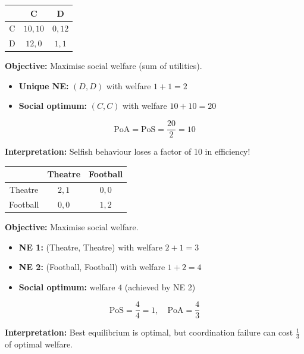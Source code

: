 \begin{exbox}
\begin{center}
\renewcommand{\arraystretch}{1.2}
\begin{tabular}{@{} c | c c @{}}
 & C & D \\
\midrule
C & $10, 10$ & $0, 12$ \\
D & $12, 0$ & $1, 1$ \\
\end{tabular}
\end{center}

\textbf{Objective:} Maximise social welfare (sum of utilities).

\begin{itemize}
  \item \textbf{Unique NE:} $(D, D)$ with welfare $1 + 1 = 2$
  \item \textbf{Social optimum:} $(C, C)$ with welfare $10 + 10 = 20$
\end{itemize}

\[
\text{PoA} = \text{PoS} = \frac{20}{2} = 10
\]

\textbf{Interpretation:} Selfish behaviour loses a factor of 10 in efficiency!
\end{exbox}

\begin{exbox}
\begin{center}
\renewcommand{\arraystretch}{1.2}
\begin{tabular}{@{} c | c c @{}}
 & Theatre & Football \\
\midrule
Theatre & $2, 1$ & $0, 0$ \\
Football & $0, 0$ & $1, 2$ \\
\end{tabular}
\end{center}

\textbf{Objective:} Maximise social welfare.

\begin{itemize}
  \item \textbf{NE 1:} (Theatre, Theatre) with welfare $2 + 1 = 3$
  \item \textbf{NE 2:} (Football, Football) with welfare $1 + 2 = 4$
  \item \textbf{Social optimum:} welfare $4$ (achieved by NE 2)
\end{itemize}

\[
\text{PoS} = \frac{4}{4} = 1, \quad \text{PoA} = \frac{4}{3}
\]

\textbf{Interpretation:} Best equilibrium is optimal, but coordination failure can cost $\frac{1}{3}$ of optimal welfare.
\end{exbox}

